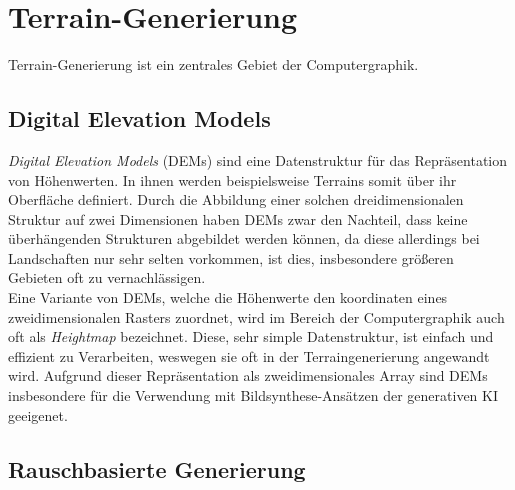 
\section{Terrain-Generierung}

Terrain-Generierung ist ein zentrales Gebiet der Computergraphik. 

\subsection{Digital Elevation Models}

\textit{Digital Elevation Models} (DEMs) sind eine Datenstruktur für das Repräsentation von Höhenwerten. In ihnen werden beispielsweise Terrains somit über ihr Oberfläche definiert. Durch die Abbildung einer solchen dreidimensionalen Struktur auf zwei Dimensionen haben DEMs zwar den Nachteil, dass keine überhängenden Strukturen abgebildet werden können, da diese allerdings bei Landschaften nur sehr selten vorkommen, ist dies, insbesondere größeren Gebieten oft zu vernachlässigen.\\
Eine Variante von DEMs, welche die Höhenwerte den koordinaten eines zweidimensionalen Rasters zuordnet, wird im Bereich der Computergraphik auch oft als \textit{Heightmap} bezeichnet. Diese, sehr simple Datenstruktur, ist einfach und effizient zu Verarbeiten, weswegen sie oft in der Terraingenerierung angewandt wird. Aufgrund dieser Repräsentation als zweidimensionales Array sind DEMs insbesondere für die Verwendung mit Bildsynthese-Ansätzen der generativen KI geeigenet.

\subsection{Rauschbasierte Generierung}

